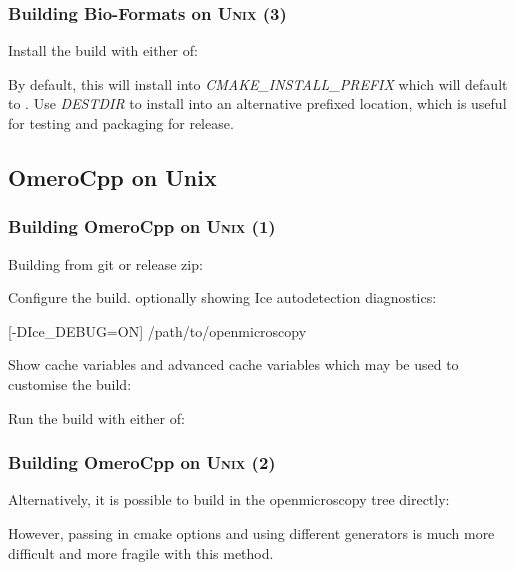 \documentclass{beamer}
\newcommand{\opt}[1]{\textsl{#1}}
\begin{document}
\begin{frame}[fragile]
  \frametitle{Building Bio-Formats on U\textsc{nix} (3)}
  \scriptsize

Install the build with either of:

  \begin{semiverbatim}
\end{semiverbatim}

By default, this will install into \opt{CMAKE\_INSTALL\_PREFIX} which
will default to .  Use \opt{DESTDIR} to install into
an alternative prefixed location, which is useful for testing and
packaging for release.
\end{frame}

\subsection{OmeroCpp on Unix}

\begin{frame}[fragile]
  \frametitle{Building OmeroCpp on U\textsc{nix} (1)}
  \scriptsize
  Building from git or release zip:

  Configure the build. optionally showing Ice autodetection diagnostics:

  \begin{semiverbatim}
  [-DIce_DEBUG=ON] /path/to/openmicroscopy
\end{semiverbatim}

  Show cache variables and advanced cache variables which may be used to customise the build:

  \begin{semiverbatim}
\end{semiverbatim}

Run the build with either of:

  \begin{semiverbatim}
\end{semiverbatim}
\end{frame}

\begin{frame}[fragile]
  \frametitle{Building OmeroCpp on U\textsc{nix} (2)}
  \scriptsize
Alternatively, it is possible to build in the openmicroscopy tree
directly:

  \begin{semiverbatim}
\end{semiverbatim}

However, passing in cmake options and using different generators is
much more difficult and more fragile with this method.
\end{frame}
\end{document}
